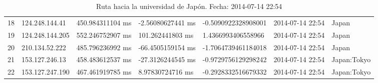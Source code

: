 \begin{table}[H]
{\begin{tabular}{lllllll}
18  & 124.248.144.41  & 450.984311104 ms & -2.56080627441 ms & -0.5090922328908001  & 2014-07-14 22:54 & Japan               \\
19  & 124.248.144.205 & 552.246752907 ms & 101.262441803 ms  & 1.4366993406558966   & 2014-07-14 22:54 & Japan               \\
20  & 210.134.52.222  & 485.796236992 ms & -66.4505159154 ms & -1.7064739461184018  & 2014-07-14 22:54 & Japan               \\
21  & 153.127.246.13  & 458.483612537 ms & -27.3126244545 ms & -0.9729756129298242  & 2014-07-14 22:54 & Japan:Tokyo         \\
22  & 153.127.247.190 & 467.461919785 ms & 8.97830724716 ms  & -0.2928332516679332  & 2014-07-14 22:54 & Japan:Tokyo        
\end{tabular}
}
\caption{Ruta hacia la universidad de Japón. Fecha: 2014-07-14 22:54}
\label{my-label}
\end{table}

